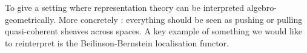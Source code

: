 \documentclass[./main.tex]{subfiles}
\begin{document}
  
To give a setting where representation theory can be
interpreted algebro-geometrically.
More concretely : 
everything should be seen as pushing or pulling
quasi-coherent sheaves across spaces.
A key example of something we would like
to reinterpret is the Beilinson-Bernstein localisation functor.
\end{document}

